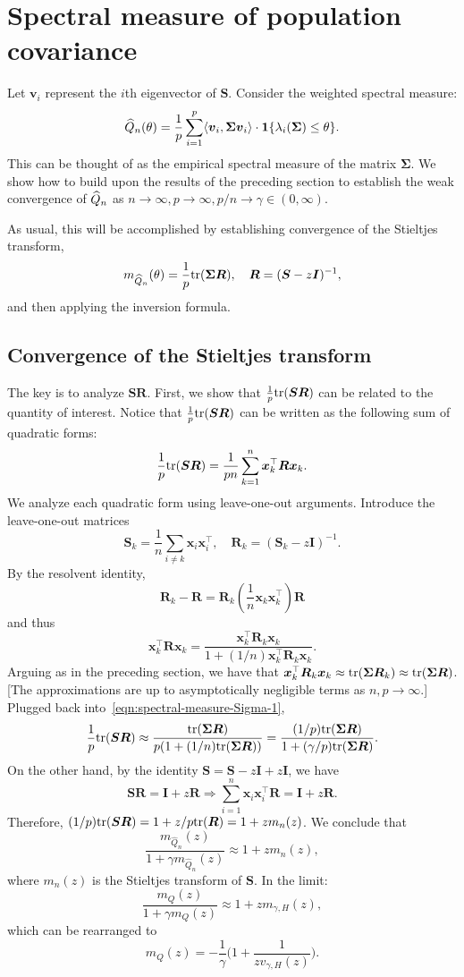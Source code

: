 \documentclass{article}
\newcommand{\bx}{\boldsymbol{x}}
\newcommand{\bv}{\boldsymbol{v}}
\newcommand{\bSigma}{\boldsymbol{\Sigma}}
\newcommand{\bS}{\boldsymbol{S}}
\newcommand{\bR}{\boldsymbol{R}}
\newcommand{\bI}{\boldsymbol{I}}
\begin{document}
\section{Spectral measure of population covariance}
Let $\bv_i$ represent the $i$th eigenvector of $\bS$. Consider the weighted spectral measure:
$$
\wh{Q}_n(\theta) = \frac{1}{p} \sum_{i = 1}^{p} \dotp{\bv_i}{\bSigma \bv_i} \cdot \1\{\lambda_i(\bSigma) \leq \theta\}.
$$
This can be thought of as the empirical spectral measure of the matrix $\bSigma$.
We show how to build upon the results of the preceding section to establish the weak convergence of $\widehat{Q}_n$ as $n \to \infty, p \to \infty, p/n \to \gamma \in (0,\infty)$. 

As usual, this will be accomplished by establishing convergence of the Stieltjes transform, 
$$
m_{\wh{Q}_n}(\theta) = \frac{1}{p}\tr(\bSigma \bR), \quad \bR = (\bS - z \bI)^{-1},
$$
and then applying the inversion formula.

\subsection{Convergence of the Stieltjes transform}
The key is to analyze $\bS \bR$. First, we show that $\frac{1}{p}\tr(\bS \bR)$ can be related to the quantity of interest. Notice that $\frac{1}{p}\tr(\bS \bR)$ can be written as the following sum of quadratic forms:
\begin{equation}
	\label{eqn:spectral-measure-Sigma-1}
	\frac{1}{p}\tr(\bS \bR) = \frac{1}{pn} \sum_{k = 1}^{n} \bx_k^{\top} \bR \bx_k.
\end{equation}
We analyze each quadratic form using leave-one-out arguments. Introduce the leave-one-out matrices
$$
\bS_k = \frac{1}{n} \sum_{i \neq k} \bx_i \bx_i^{\top}, \quad \bR_k = (\bS_k - z \bI)^{-1}.
$$
By the resolvent identity, 
$$
\bR_k - \bR = \bR_k(\frac{1}{n} \bx_k \bx_k^{\top}) \bR
$$
and thus
$$
\bx_k^{\top} \bR \bx_k = \frac{\bx_k^{\top} \bR_k \bx_k}{1 + (1/n)\bx_k^{\top} \bR_k \bx_k}.
$$
Arguing as in the preceding section, we have that $\bx_k^{\top} \bR_k \bx_k \approx \tr(\bSigma \bR_k) \approx \tr(\bSigma \bR)$. [The approximations are up to asymptotically negligible terms as $n,p \to \infty$.] Plugged back into~\eqref{eqn:spectral-measure-Sigma-1},
$$
\frac{1}{p}\tr(\bS \bR) \approx \frac{\tr(\bSigma \bR)}{p(1 + (1/n) \tr(\bSigma \bR))} = \frac{(1/p) \tr(\bSigma \bR)}{1 + (\gamma/p) \tr(\bSigma \bR)}.
$$
On the other hand, by the identity $\bS = \bS - z\bI + z \bI$, we have
$$
\bS \bR = \bI  + z \bR \Longrightarrow \sum_{i = 1}^{n} \bx_i \bx_i^{\top} \bR = \bI  + z \bR.
$$ 
Therefore, $(1/p) \tr(\bS \bR) = 1 + z/p\tr(\bR) = 1 + z m_{n}(z)$. We conclude that 
$$
\frac{m_{\hat{Q}_n}(z)}{1 + \gamma m_{\hat{Q}_n}(z)} \approx 1 + z m_{n}(z),
$$ 
where $m_n(z)$ is the Stieltjes transform of $\bS$. In the limit:
$$
\frac{m_{Q}(z)}{1 + \gamma m_{Q}(z)} \approx 1 + z m_{\gamma,H}(z),
$$
which can be rearranged to 
$$
m_Q(z) = -\frac{1}{\gamma}\bigg(1 + \frac{1}{z v_{\gamma,H}(z)}\bigg).
$$
\end{document}
